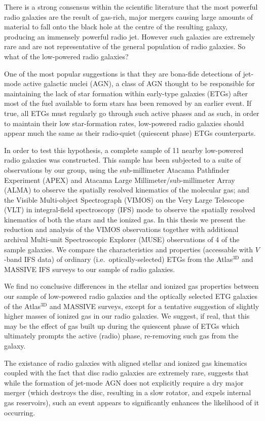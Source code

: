 \begin{abstractlong}
There is a strong consensus within the scientific literature that the most powerful radio galaxies are the result of gas-rich, major mergers causing large amounts of material to fall onto the black hole at the centre of the resulting galaxy, producing an immensely powerful radio jet. However such galaxies are extremely rare and are not representative of the general population of radio galaxies. So what of the low-powered radio galaxies? 

One of the most popular suggestions is that they are bona-fide detections of jet-mode active galactic nuclei (AGN), a class of AGN thought to be responsible for maintaining the lack of star formation within early-type galaxies (ETGs) after most of the fuel available to form stars has been removed by an earlier event. If true, all ETGs must regularly go through such active phases and as such, in order to maintain their low star-formation rates, low-powered radio galaxies should appear much the same as their radio-quiet (quiescent phase) ETGs counterparts. 

In order to test this hypothesis, a complete sample of 11 nearby low-powered radio galaxies was constructed. This sample has been subjected to a suite of observations by our group, using the sub-millimeter Atacama Pathfinder Experiment (APEX) and Atacama Large Millimeter/sub-millimeter Array (ALMA) to observe the spatially resolved kinematics of the molecular gas; and the Visible Multi-object Spectrograph (VIMOS) on the Very Large Telescope (VLT) in integral-field spectroscopy (IFS) mode to observe the spatially resolved kinematics of both the stars and the ionized gas. In this thesis we present the reduction and analysis of the VIMOS observations together with additional archival Multi-unit Spectroscopic Explorer (MUSE) observations of 4 of the sample galaxies. We compare the characteristics and properties (accessable with $V$-band IFS data) of ordinary (i.e.\ optically-selected) ETGs from the Atlas$^\text{3D}$ and MASSIVE IFS surveys to our sample of radio galaxies.

We find no conclusive differences in the stellar and ionized gas properties between our sample of low-powered radio galaxies and the optically selected ETG galaxies of the Atlas$^\text{3D}$ and MASSIVE surveys, except for a tentative suggestion of slightly higher masses of ionized gas in our radio galaxies. We suggest, if real, that this may be the effect of gas built up during the quiescent phase of ETGs which ultimately prompts the active (radio) phase, re-removing such gas from the galaxy.

The existance of radio galaxies with aligned stellar and ionized gas kinematics coupled with the fact that disc radio galaxies are extremely rare, suggests that while the formation of jet-mode AGN does not explicitly require a dry major merger (which destroys the disc, resulting in a slow rotator, and expels internal gas reservoirs), such an event appears to significantly enhances the likelihood of it occurring. 
\end{abstractlong}